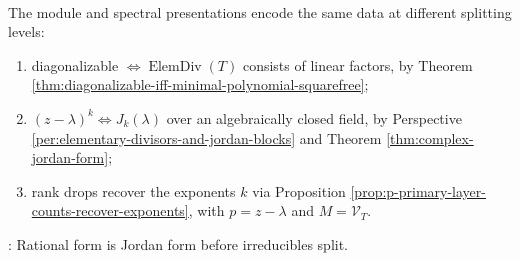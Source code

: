 \begin{perspective} \label{per:module-and-spectral-canonical-form-crosswalk} \\
The module and spectral presentations encode the same data at different splitting levels:
\begin{enumerate}[label=(\roman*)]
\setlength{\itemsep}{0pt}
\item diagonalizable $\Longleftrightarrow \operatorname{ElemDiv}(T)$ consists of linear factors, by Theorem \ref{thm:diagonalizable-iff-minimal-polynomial-squarefree};
\item $(z-\lambda)^k\Longleftrightarrow J_k(\lambda)$ over an algebraically closed field, by Perspective \ref{per:elementary-divisors-and-jordan-blocks} and Theorem \ref{thm:complex-jordan-form};
\item rank drops recover the exponents $k$ via Proposition \ref{prop:p-primary-layer-counts-recover-exponents}, with $p=z-\lambda$ and $M=\mathcal{V}_T$.
\end{enumerate}
: Rational form is Jordan form before irreducibles split.
\end{perspective}
